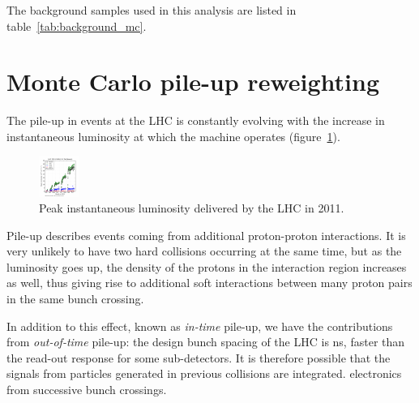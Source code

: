 The background samples used in this analysis are listed in
table~\ref{tab:background_mc}.



\section{Monte Carlo pile-up reweighting}
The pile-up in events at the LHC is constantly evolving with the increase in
instantaneous luminosity at which the machine operates
(figure~\ref{fig:inst_lumi}).
\begin{figure}[htb]
    \centering
    \includegraphics[width=\textwidth]{images/pdf/plu_days_liny}

    \caption{Peak instantaneous luminosity delivered by the LHC in 2011.}
    \label{fig:inst_lumi}
\end{figure}
Pile-up describes events coming from additional proton-proton interactions.
It is very unlikely to have two hard collisions occurring at the same time,
but as the luminosity goes up, the density of the protons in the interaction
region increases as well, thus giving rise to additional soft interactions
between many proton pairs in the same bunch crossing.

In addition to this effect, known as \emph{in-time} pile-up, we have the
contributions from \emph{out-of-time} pile-up: the design bunch spacing
of the LHC is \unit[25]{ns}, faster than the read-out response for some
sub-detectors. It is therefore possible that the signals from particles
generated in previous collisions are integrated.
electronics from successive bunch crossings.

